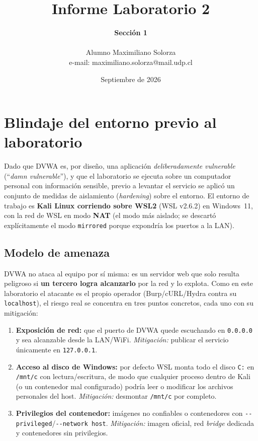 \documentclass[letter,12pt]{article}
\begin{document}
%
   \title{\Huge{Informe Laboratorio 2}}
   \author{\textbf{Sección 1} \\  \\Alumno Maximiliano Solorza \\ e-mail: maximiliano.solorza@mail.udp.cl}

   \date{Septiembre de 2026}
   \maketitle

   \tableofcontents

  \newpage

\section*{Blindaje del entorno previo al laboratorio}

Dado que DVWA es, por diseño, una aplicación \emph{deliberadamente vulnerable} (``\emph{damn vulnerable}''), y que el laboratorio se ejecuta sobre un computador personal con información sensible, previo a levantar el servicio se aplicó un conjunto de medidas de aislamiento (\emph{hardening}) sobre el entorno. El entorno de trabajo es \textbf{Kali Linux corriendo sobre WSL2} (WSL v2.6.2) en Windows~11, con la red de WSL en modo \textbf{NAT} (el modo más aislado; se descartó explícitamente el modo \texttt{mirrored} porque expondría los puertos a la LAN).

\subsection*{Modelo de amenaza}
DVWA no ataca al equipo por sí misma: es un servidor web que solo resulta peligroso si \textbf{un tercero logra alcanzarlo} por la red y lo explota. Como en este laboratorio el atacante es el propio operador (Burp/cURL/Hydra contra su \texttt{localhost}), el riesgo real se concentra en tres puntos concretos, cada uno con su mitigación:

\begin{enumerate}
    \item \textbf{Exposición de red:} que el puerto de DVWA quede escuchando en \texttt{0.0.0.0} y sea alcanzable desde la LAN/WiFi. \textit{Mitigación:} publicar el servicio únicamente en \texttt{127.0.0.1}.
    \item \textbf{Acceso al disco de Windows:} por defecto WSL monta todo el disco \texttt{C:} en \texttt{/mnt/c} con lectura/escritura, de modo que cualquier proceso dentro de Kali (o un contenedor mal configurado) podría leer o modificar los archivos personales del host. \textit{Mitigación:} desmontar \texttt{/mnt/c} por completo.
    \item \textbf{Privilegios del contenedor:} imágenes no confiables o contenedores con \texttt{-{}-privileged}/\texttt{-{}-network host}. \textit{Mitigación:} imagen oficial, red \emph{bridge} dedicada y contenedores sin privilegios.
\end{enumerate}
\end{document}
